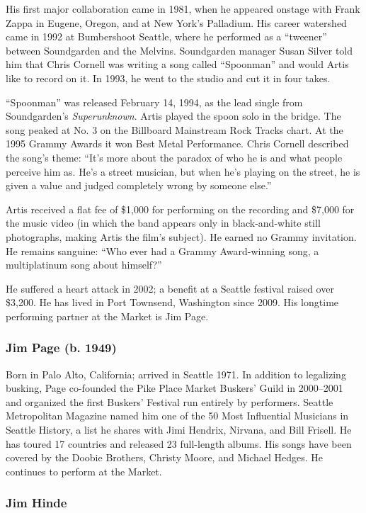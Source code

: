 \documentclass[11pt,letterpaper]{article}
\begin{document}
His first major collaboration came in 1981, when he appeared onstage with Frank Zappa in Eugene, Oregon, and at New York's Palladium. His career watershed came in 1992 at Bumbershoot Seattle, where he performed as a ``tweener'' between Soundgarden and the Melvins. Soundgarden manager Susan Silver told him that Chris Cornell was writing a song called ``Spoonman'' and would Artis like to record on it. In 1993, he went to the studio and cut it in four takes.

``Spoonman'' was released February 14, 1994, as the lead single from Soundgarden's \textit{Superunknown}. Artis played the spoon solo in the bridge. The song peaked at No. 3 on the Billboard Mainstream Rock Tracks chart. At the 1995 Grammy Awards it won Best Metal Performance. Chris Cornell described the song's theme: ``It's more about the paradox of who he is and what people perceive him as. He's a street musician, but when he's playing on the street, he is given a value and judged completely wrong by someone else.''

Artis received a flat fee of \$1,000 for performing on the recording and \$7,000 for the music video (in which the band appears only in black-and-white still photographs, making Artis the film's subject). He earned no Grammy invitation. He remains sanguine: ``Who ever had a Grammy Award-winning song, a multiplatinum song about himself?''

He suffered a heart attack in 2002; a benefit at a Seattle festival raised over \$3,200. He has lived in Port Townsend, Washington since 2009. His longtime performing partner at the Market is Jim Page.

\subsubsection{Jim Page (b. 1949)}

Born in Palo Alto, California; arrived in Seattle 1971. In addition to legalizing busking, Page co-founded the Pike Place Market Buskers' Guild in 2000--2001 and organized the first Buskers' Festival run entirely by performers. Seattle Metropolitan Magazine named him one of the 50 Most Influential Musicians in Seattle History, a list he shares with Jimi Hendrix, Nirvana, and Bill Frisell. He has toured 17 countries and released 23 full-length albums. His songs have been covered by the Doobie Brothers, Christy Moore, and Michael Hedges. He continues to perform at the Market.

\subsubsection{Jim Hinde}
\end{document}
